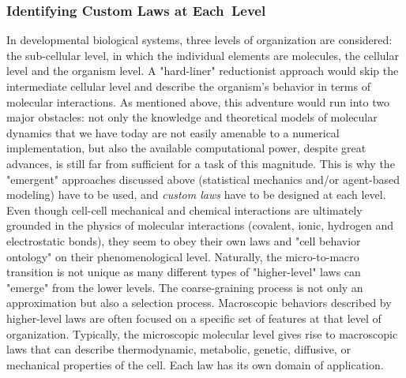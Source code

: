 \subsubsection{Identifying Custom Laws at Each Level}

  In developmental biological systems, three levels of organization are considered: the sub-cellular level, in which the individual elements are molecules, the cellular level and the organism level. A "hard-liner" reductionist approach would skip the intermediate cellular level and describe the organism's behavior in terms of molecular interactions. As mentioned above, this adventure would run into two major obstacles: not only the knowledge and theoretical models of molecular dynamics that we have today are not easily amenable to a numerical implementation, but also the available computational power, despite great advances, is still far from sufficient for a task of this magnitude. This is why the "emergent" approaches discussed above (statistical mechanics and/or agent-based modeling) have to be used, and \textit{custom laws} have to be designed at each level. Even though cell-cell mechanical and chemical interactions are ultimately grounded in the physics of molecular interactions (covalent, ionic, hydrogen and electrostatic bonds), they seem to obey their own laws and "cell behavior ontology" on their phenomenological level. Naturally, the micro-to-macro transition is not unique as many different types of "higher-level" laws can "emerge" from the lower levels. The coarse-graining process is not only an approximation but also a selection process. Macroscopic behaviors described by higher-level laws are often focused on a specific set of features at that level of organization. Typically, the microscopic molecular level gives rise to macroscopic laws that can describe thermodynamic, metabolic, genetic, diffusive, or mechanical properties of the cell. Each law has its own domain of application. 

